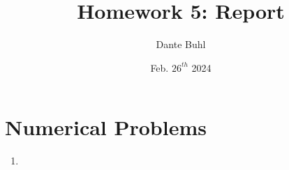 \documentclass{article}
\title{Homework 5: Report}
\author{Dante Buhl}
\date{Feb. $26^{th}$ 2024}
\begin{document}
\newcommand{\bs}[1]{\boldsymbol{#1}}
\newcommand{\bmp}[1]{\begin{minipage}{#1\textwidth}}
\newcommand{\emp}{\end{minipage}}
\newcommand{\R}{\mathbb{R}}
\newcommand{\C}{\mathbb{C}}
\newcommand{\N}{\mathcal{N}}
\newcommand{\I}{\mathrm{I}}
\newcommand{\K}{\bs{\mathrm{K}}}
\newcommand{\m}{\bs{\mu}_*}
\newcommand{\s}{\bs{\Sigma}_*}
\newcommand{\dt}{\Delta t}
\newcommand{\tr}[1]{\text{Tr}(#1)}
\newcommand{\Tr}[1]{\text{Tr}(#1)}

\maketitle


\setcounter{section}{1}

\section{Numerical Problems}
\begin{enumerate}
    
\item 
   
\end{enumerate}
\end{document}
